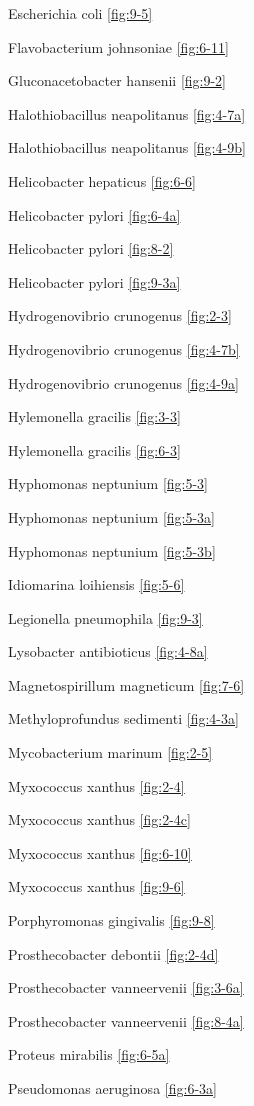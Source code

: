 \documentclass[]{tufte-book}
\begin{document}
Escherichia coli \ref{fig:9-5}

Flavobacterium johnsoniae \ref{fig:6-11}

Gluconacetobacter hansenii \ref{fig:9-2}

Halothiobacillus neapolitanus \ref{fig:4-7a}

Halothiobacillus neapolitanus \ref{fig:4-9b}

Helicobacter hepaticus \ref{fig:6-6}

Helicobacter pylori \ref{fig:6-4a}

Helicobacter pylori \ref{fig:8-2}

Helicobacter pylori \ref{fig:9-3a}

Hydrogenovibrio crunogenus \ref{fig:2-3}

Hydrogenovibrio crunogenus \ref{fig:4-7b}

Hydrogenovibrio crunogenus \ref{fig:4-9a}

Hylemonella gracilis \ref{fig:3-3}

Hylemonella gracilis \ref{fig:6-3}

Hyphomonas neptunium \ref{fig:5-3}

Hyphomonas neptunium \ref{fig:5-3a}

Hyphomonas neptunium \ref{fig:5-3b}

Idiomarina loihiensis \ref{fig:5-6}

Legionella pneumophila \ref{fig:9-3}

Lysobacter antibioticus \ref{fig:4-8a}

Magnetospirillum magneticum \ref{fig:7-6}

Methyloprofundus sedimenti \ref{fig:4-3a}

Mycobacterium marinum \ref{fig:2-5}

Myxococcus xanthus \ref{fig:2-4}

Myxococcus xanthus \ref{fig:2-4c}

Myxococcus xanthus \ref{fig:6-10}

Myxococcus xanthus \ref{fig:9-6}

Porphyromonas gingivalis \ref{fig:9-8}

Prosthecobacter debontii \ref{fig:2-4d}

Prosthecobacter vanneervenii \ref{fig:3-6a}

Prosthecobacter vanneervenii \ref{fig:8-4a}

Proteus mirabilis \ref{fig:6-5a}

Pseudomonas aeruginosa \ref{fig:6-3a}
\end{document}
